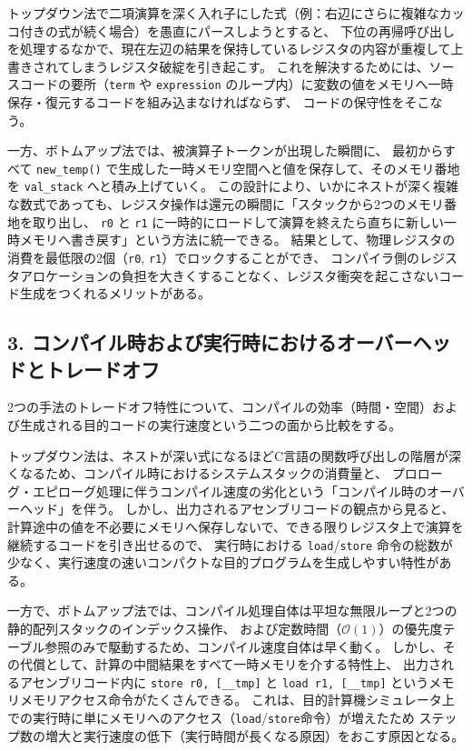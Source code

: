 \documentclass[11pt,a4paper,dvipdfmx]{bxjsarticle}
\begin{document}
トップダウン法で二項演算を深く入れ子にした式（例：右辺にさらに複雑なカッコ付きの式が続く場合）を愚直にパースしようとすると、
下位の再帰呼び出しを処理するなかで、現在左辺の結果を保持しているレジスタの内容が重複して上書きされてしまうレジスタ破綻を引き起こす。
これを解決するためには、ソースコードの要所（\texttt{term} や \texttt{expression} のループ内）に変数の値をメモリへ一時保存・復元するコードを組み込まなければならず、
コードの保守性をそこなう。

一方、ボトムアップ法では、被演算子トークンが出現した瞬間に、
最初からすべて \texttt{new\_temp()} で生成した一時メモリ空間へと値を保存して、そのメモリ番地を \texttt{val\_stack} へと積み上げていく。
この設計により、いかにネストが深く複雑な数式であっても、レジスタ操作は還元の瞬間に「スタックから2つのメモリ番地を取り出し、
\texttt{r0} と \texttt{r1} に一時的にロードして演算を終えたら直ちに新しい一時メモリへ書き戻す」という方法に統一できる。
結果として、物理レジスタの消費を最低限の2個（\texttt{r0}, \texttt{r1}）でロックすることができ、
コンパイラ側のレジスタアロケーションの負担を大きくすることなく、レジスタ衝突を起こさないコード生成をつくれるメリットがある。

\subsection*{3. コンパイル時および実行時におけるオーバーヘッドとトレードオフ}
2つの手法のトレードオフ特性について、コンパイルの効率（時間・空間）および生成される目的コードの実行速度という二つの面から比較をする。

トップダウン法は、ネストが深い式になるほどC言語の関数呼び出しの階層が深くなるため、コンパイル時におけるシステムスタックの消費量と、
プロローグ・エピローグ処理に伴うコンパイル速度の劣化という「コンパイル時のオーバーヘッド」を伴う。
しかし、出力されるアセンブリコードの観点から見ると、計算途中の値を不必要にメモリへ保存しないで、できる限りレジスタ上で演算を継続するコードを引き出せるので、
実行時における \texttt{load}/\texttt{store} 命令の総数が少なく、実行速度の速いコンパクトな目的プログラムを生成しやすい特性がある。

一方で、ボトムアップ法では、コンパイル処理自体は平坦な無限ループと2つの静的配列スタックのインデックス操作、
および定数時間（$\mathcal{O}(1)$）の優先度テーブル参照のみで駆動するため、コンパイル速度自体は早く動く。
しかし、その代償として、計算の中間結果をすべて一時メモリを介する特性上、
出力されるアセンブリコード内に \texttt{store r0, [\_\_tmp]} と \texttt{load r1, [\_\_tmp]} というメモリメモリアクセス命令がたくさんできる。
これは、目的計算機シミュレータ上での実行時に単にメモリへのアクセス（\texttt{load}/\texttt{store}命令）が増えたため
ステップ数の増大と実行速度の低下（実行時間が長くなる原因）をおこす原因となる。
\end{document}
